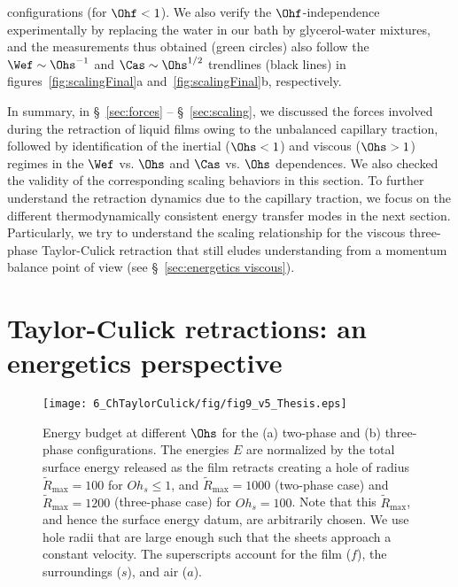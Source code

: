 configurations (for $\Ohf < 1$). We also verify the $\Ohf$-independence experimentally by replacing the water in our bath by glycerol-water mixtures, and the measurements thus obtained (green circles) also follow the $\Wef \sim \Ohs^{-1}$ and $\Cas \sim \Ohs^{1/2}$ trendlines (black lines) in figures~\ref{fig:scalingFinal}a and~\ref{fig:scalingFinal}b, respectively.  

In summary, in \S~\ref{sec:forces} -- \S~\ref{sec:scaling}, we discussed the forces involved during the retraction of liquid films owing to the unbalanced capillary traction, followed by identification of the inertial ($\Ohs < 1$) and viscous ($\Ohs > 1$) regimes in the $\Wef$ vs. $\Ohs$ and $\Cas$ vs. $\Ohs$ dependences. We also checked the validity of the corresponding scaling behaviors in this section. To further understand the retraction dynamics due to the capillary traction, we focus on the different thermodynamically consistent energy transfer modes in the next section. Particularly, we try to understand the scaling relationship for the viscous three-phase Taylor-Culick retraction that still eludes understanding from a momentum balance point of view (see \S~\ref{sec:energetics viscous}). 

\section{Taylor-Culick retractions: an energetics perspective} 
\label{sec:energetics}
\begin{figure}
	\centering
	\texttt{[image: 6\_ChTaylorCulick/fig/fig9\_v5\_Thesis.eps]}
	\caption{Energy budget at different $\Ohs$ for the (a) two-phase and (b) three-phase configurations. The energies $E$ are normalized by the total surface energy released as the film retracts creating a hole of radius $\tilde{R}_{\text{max}} = 100$ for $Oh_s \le 1$, and $\tilde{R}_{\text{max}} = 1000$ (two-phase case) and $\tilde{R}_{\text{max}} = 1200$ (three-phase case) for $Oh_s = 100$. Note that this $\tilde{R}_{\text{max}}$, and hence the surface energy datum, are arbitrarily chosen. We use hole radii that are large enough such that the sheets approach a constant velocity. The superscripts account for the film ($f$), the surroundings ($s$), and air ($a$). }
	\label{fig:energy}
\end{figure}

